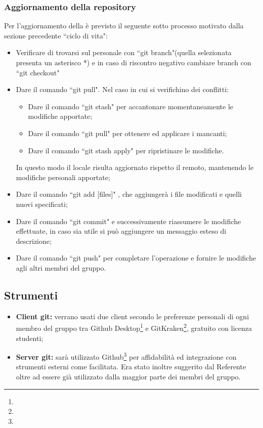 \documentclass[NormeDiProgetto.tex]{subfiles}
\begin{document}
	\subsubsection{Aggiornamento della repository}
	Per l'aggiornamento della  è previsto il seguente sotto processo motivato dalla sezione precedente \textquotedblleft ciclo di vita":
	\begin{itemize}
		\item Verificare di trovarsi sul  personale con \textquotedblleft git branch"(quella selezionata presenta un asterisco *) e in caso di riscontro negativo cambiare branch con \textquotedblleft git checkout"
		\item Dare il comando \textquotedblleft git pull". Nel caso in cui si verifichino dei conflitti:
		\begin{itemize}
			\item Dare il comando \textquotedblleft git stash" per accantonare momentaneamente	le modifiche apportate;
			\item Dare il comando \textquotedblleft git pull" per ottenere ed applicare i  mancanti;
			\item Dare il comando \textquotedblleft git stash apply" per ripristinare le modifiche.
		\end{itemize}
		In questo modo il  locale risulta aggiornato rispetto il  remoto, mantenendo le modifiche personali apportate;
	
		\item Dare il comando \textquotedblleft git add [files]" , che aggiungerà i file modificati e quelli nuovi specificati;
		\item Dare il comando \textquotedblleft git commit" e successivamente riassumere le modifiche effettuate, in caso sia utile si può aggiungere un messaggio esteso di descrizione;
		\item Dare il comando \textquotedblleft git push" per completare l'operazione e fornire le modifiche agli altri membri del gruppo.
	\end{itemize}
	\subsection{Strumenti}
	\begin{itemize}
		\item \textbf{Client git:} verrano usati due client secondo le preferenze personali di ogni membro del gruppo tra Github Desktop\footnote{} e GitKraken\footnote{}, gratuito con licenza studenti;
		\item \textbf{Server git:} sarà utilizzato Github\footnote{} per affidabilità ed integrazione con strumenti esterni come  facilitata. Era stato inoltre suggerito dal Referente oltre ad essere già utilizzato dalla maggior parte dei membri del gruppo.
	\end{itemize}
\end{document}
